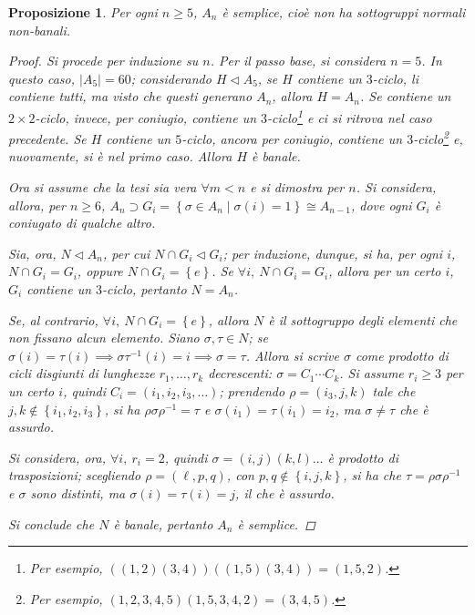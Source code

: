 \documentclass[12pt]{scrartcl}
\theoremstyle{style}
\newtheorem{prop}{Proposizione}[section]
\numberwithin{equation}{subsection}
\begin{document}
\begin{prop}
	Per ogni $n\ge 5$, $A_n$ \`e semplice, cio\`e non ha sottogruppi normali non-banali.
	\begin{proof}
Si procede per induzione su $n$.
Per il passo base, si considera $n=5$. 
In questo caso, $\lvert A_5 \rvert =60$; considerando $H \lhd A_5$, se $H$ contiene un $3$-ciclo, li contiene tutti, ma visto che questi generano $A_n$, allora $H = A_n$.
Se contiene un $2\times 2$-ciclo, invece, per coniugio, contiene un $3$-ciclo\footnote{Per esempio, $((1,2)(3,4))((1,5)(3,4)) = (1,5,2)$.} e ci si ritrova nel caso precedente.
Se $H$ contiene un $5$-ciclo, ancora per coniugio, contiene un $3$-ciclo\footnote{Per esempio, $(1,2,3,4,5) (1,5,3,4,2) = (3,4,5)$.} e, nuovamente, si \`e nel primo caso.
Allora $H$ \`e banale.

Ora si assume che la tesi sia vera $\forall m < n$ e si dimostra per $n$.
Si considera, allora, per $n\ge 6$, $A_n \supset G_i = \left\{ \sigma \in A_n  \mid \sigma (i) = 1 \right\} \cong A_{n-1} $, dove ogni $G_i$ \`e coniugato di qualche altro.

Sia, ora, $N \lhd A_n$, per cui $N\cap G_i \lhd G_i$; per induzione, dunque, si ha, per ogni $i$, $N\cap G_i = G_i$, oppure $N\cap G_i = \left\{ e \right\} $.
Se $\forall i, \ N\cap G_i = G_i$, allora per un certo $i$, $G_i$ contiene un $3$-ciclo, pertanto $N = A_n$.

Se, al contrario, $\forall i,\ N\cap G_i = \left\{ e \right\} $, allora $N$ \`e il sottogruppo degli elementi che non fissano alcun elemento.
Siano $\sigma , \tau  \in N$; se $\sigma (i) = \tau  (i) \implies \sigma \tau ^{-1}(i) = i\implies \sigma =\tau $.
Allora si scrive $\sigma $ come prodotto di cicli disgiunti di lunghezze $r_1,\ldots,r_k$ decrescenti: $\sigma  = C_1\cdots C_k$.
Si assume $r_i \ge 3$ per un certo $i$, quindi $C_i= (i_1,i_2,i_3,\ldots)$; prendendo $\rho =(i_3,j,k)$ tale che $j,k \not \in \left\{ i_1,i_2,i_3 \right\} $, si ha $\rho \sigma \rho ^{-1}= \tau $ e $\sigma (i_1) = \tau (i_1)= i_2$, ma $\sigma \neq \tau $ che \`e assurdo.

Si considera, ora, $\forall i, \ r_i=2$, quindi $\sigma = (i,j)(k,l)\ldots$ \`e prodotto di trasposizioni; scegliendo $\rho =(\ell ,p,q)$, con $p,q \not \in \left\{ i,j,k \right\} $, si ha che $\tau  = \rho \sigma \rho ^{-1}$ e $\sigma $ sono distinti, ma $\sigma (i) = \tau (i) = j$, il che \`e assurdo.

Si conclude che $N$ \`e banale, pertanto $A_n$ \`e semplice.
	\end{proof}
\end{prop}
\end{document}
